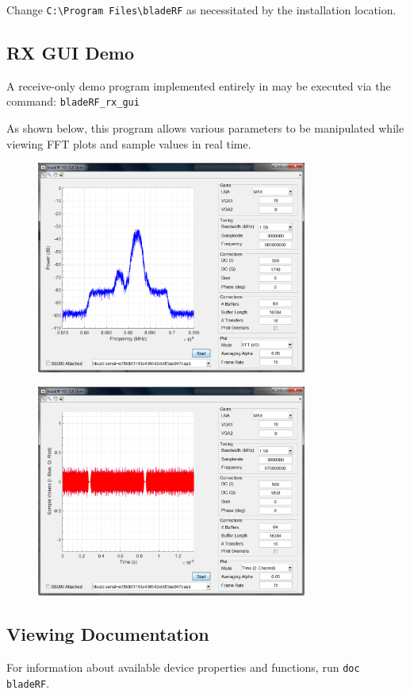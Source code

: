 {Change \texttt{C:\textbackslash Program Files\textbackslash bladeRF} as necessitated by the installation location.

\newpage
\subsection{RX GUI Demo}
A receive-only demo program implemented entirely in \matlab may be executed via the command: \texttt{bladeRF\_rx\_gui}

As shown below, this program allows various parameters to be manipulated while viewing FFT plots and sample values in real time.

\begin{figure}[h]
  \centering
  \includegraphics[width=3.5in]{images/windows/matlab/rxgui-freq.png}
\end{figure}

\begin{figure}[h]
  \centering
  \includegraphics[width=3.5in]{images/windows/matlab/rxgui-time.png}
\end{figure}

\newpage
\subsection{Viewing Documentation}
For information about available device properties and functions, run \texttt{doc bladeRF}.

}
